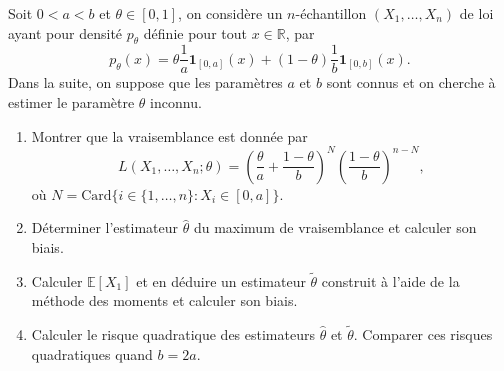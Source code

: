 \begin{mdframed}
\begin{exercice}
Soit $0 < a < b$ et $\theta \in [0, 1]$, on considère un $n$-échantillon $(X_1, \dots, X_n)$ de loi ayant pour densité $p_\theta$ définie pour tout $x \in \mathbb{R}$, par
\begin{equation*}
p_\theta(x) = \theta \frac{1}{a}\mathbf{1}_{[0, a]}(x) + (1 - \theta) \frac{1}{b}\mathbf{1}_{[0, b]}(x).
\end{equation*}
Dans la suite, on suppose que les paramètres $a$ et $b$ sont connus et on cherche à estimer le paramètre $\theta$ inconnu.

\begin{enumerate}
    \item Montrer que la vraisemblance est donnée par
    \begin{equation*}
    L(X_1, \dots, X_n; \theta) = \left( \frac{\theta}{a} + \frac{1 - \theta}{b} \right)^N \left( \frac{1 - \theta}{b} \right)^{n - N},
    \end{equation*}
    où $N = \text{Card}\{i \in \{1, \dots, n\} : X_i \in [0, a]\}$.
    \item Déterminer l'estimateur $\hat{\theta}$ du maximum de vraisemblance et calculer son biais.
    \item Calculer $\mathbb{E}[X_1]$ et en déduire un estimateur $\tilde{\theta}$ construit à l'aide de la méthode des moments et calculer son biais.
    \item Calculer le risque quadratique des estimateurs $\hat{\theta}$ et $\tilde{\theta}$. Comparer ces risques quadratiques quand $b = 2a$.
\end{enumerate}
\end{exercice}
\end{mdframed}

\smallskip

